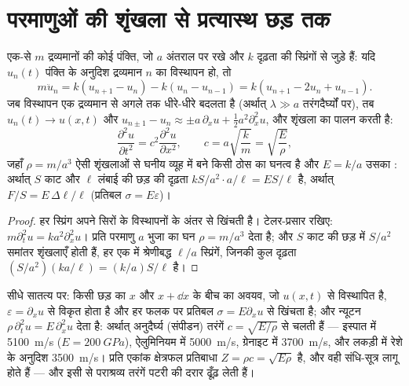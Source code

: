 \section{परमाणुओं की शृंखला से प्रत्यास्थ छड़ तक}

\begin{proposition}[परमाणुओं की शृंखला; यंग गुणांक]\label{prop:b2:waves-on-strings:chain}
एक-से $m$ द्रव्यमानों की कोई पंक्ति, जो $a$ अंतराल पर रखे और $k$ दृढ़ता की
स्प्रिंगों से जुड़े हैं: यदि $u_n(t)$ पंक्ति के अनुदिश द्रव्यमान $n$ का विस्थापन हो,
तो
\[
m\ddot u_n = k(u_{n+1} - u_n) - k(u_n - u_{n-1}) = k(u_{n+1} - 2u_n + u_{n-1}) .
\]
जब विस्थापन एक द्रव्यमान से अगले तक धीरे-धीरे बदलता है (अर्थात्
$\lambda \gg a$ तरंगदैर्घ्यों पर), तब $u_n(t) \to u(x, t)$ और $u_{n\pm1} - u_n \approx
\pm a\,\partial_xu + \tfrac12a^2\partial_x^2u$, और शृंखला  का पालन करती है:
\[
\frac{\partial^2u}{\partial t^2} = c^2\frac{\partial^2u}{\partial x^2} , \qquad
c = a\sqrt{\frac km} = \sqrt{\frac{E}{\rho}} ,
\]
जहाँ $\rho = m/a^3$ ऐसी शृंखलाओं से घनीय व्यूह में बने किसी ठोस का
घनत्व है और $E = k/a$ उसका \emph{}: अर्थात् $S$ काट और $\ell$
लंबाई की छड़ की दृढ़ता $kS/a^2\cdot a/\ell = ES/\ell$ है,
अर्थात् \emph{} $F/S = E\,\Delta\ell/\ell$ (प्रतिबल $\sigma = E\varepsilon$)।
\end{proposition}

\begin{proof}
हर स्प्रिंग अपने सिरों के विस्थापनों के अंतर से खिंचती है।
टेलर-प्रसार रखिए: $m\partial_t^2u = ka^2\partial_x^2u$। प्रति परमाणु
$a$ भुजा का घन $\rho = m/a^3$ देता है; और $S$ काट की छड़ में
$S/a^2$ समांतर शृंखलाएँ होती हैं, हर एक में श्रेणीबद्ध $\ell/a$ स्प्रिंगें, जिनकी कुल दृढ़ता
$(S/a^2)(ka/\ell) = (k/a)S/\ell$ है।
\end{proof}

\begin{proposition}[छड़ में अनुदैर्घ्य तरंगें]\label{prop:b2:waves-on-strings:rod}
सीधे सातत्य पर: किसी छड़ का $x$ और $x +
\dd x$ के बीच का अवयव, जो $u(x, t)$ से विस्थापित है, $\varepsilon = \partial_xu$ से
विकृत होता है और हर फलक पर प्रतिबल $\sigma = E\partial_xu$ से खिंचता है; और
न्यूटन $\rho\,\partial_t^2u =
E\,\partial_x^2u$ देता है: अर्थात् अनुदैर्घ्य (संपीडन) तरंगें $c = \sqrt{E/\rho}$ से चलती हैं
--- इस्पात में \qty{5100}{m/s} ($E = \qty{200}{GPa}$), ऐलुमिनियम में \qty{5000}{m/s},
ग्रेनाइट में \qty{3700}{m/s}, और लकड़ी में रेशे के अनुदिश \qty{3500}{m/s}।
प्रति एकांक क्षेत्रफल प्रतिबाधा $Z = \rho c = \sqrt{E\rho}$ है, और वही
संधि-सूत्र लागू होते हैं --- और इसी से पराश्रव्य तरंगें
पटरी की दरार ढूँढ़ लेती हैं।
\end{proposition}

